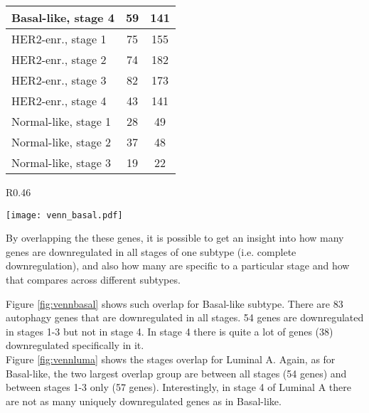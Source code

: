 \begin{table}[!h]
\begin{tabular}{l|c|c}
\multicolumn{1}{|l|}{Basal-like, stage 4} & 59 & \multicolumn{1}{c|}{141} \\ \hline\hline
\multicolumn{1}{|l|}{HER2-enr., stage 1} & 75 & \multicolumn{1}{c|}{155} \\ \hline
\multicolumn{1}{|l|}{HER2-enr., stage 2} & 74 & \multicolumn{1}{c|}{182} \\ \hline
\multicolumn{1}{|l|}{HER2-enr., stage 3} & 82 & \multicolumn{1}{c|}{173} \\ \hline
\multicolumn{1}{|l|}{HER2-enr., stage 4} & 43 & \multicolumn{1}{c|}{141} \\ \hline\hline
\multicolumn{1}{|l|}{Normal-like, stage 1} & 28 & \multicolumn{1}{c|}{49} \\ \hline
\multicolumn{1}{|l|}{Normal-like, stage 2} & 37 & \multicolumn{1}{c|}{48} \\ \hline
\multicolumn{1}{|l|}{Normal-like, stage 3} & 19 & \multicolumn{1}{c|}{22} \\ \hline
\end{tabular}
\end{table}

\newpage


\begin{wrapfigure}{R}{0.46\textwidth}
        \hfill
        \captionsetup{justification=centering}
        \centerline{ \texttt{[image: venn\_basal.pdf]}}
        
        \vspace*{-4mm}
        \caption[Overlap between downregulated autophagy genes in stages of Basal-like subtype]{\label{fig:vennbasal}Overlap between downregulated autophagy genes in stages of Basal-like subtype}
        \end{wrapfigure}
 

By overlapping the these genes, it is possible to get an insight into how many genes are downregulated in all stages of one subtype (i.e. complete downregulation), and also how many are specific to a particular stage and how that compares across different subtypes.

Figure \ref{fig:vennbasal} shows such overlap for Basal-like subtype. There are 83 autophagy genes that are downregulated in all stages. 54 genes are downregulated in stages 1-3 but not in stage 4. In stage 4 there is quite a lot of genes (38) downregulated specifically in it.\\
Figure \ref{fig:vennluma} shows the stages overlap for Luminal A. Again, as for Basal-like, the two largest overlap group are between all stages (54 genes) and between stages 1-3 only (57 genes). Interestingly, in stage 4 of Luminal A there are not as many uniquely downregulated genes as in Basal-like.\\


